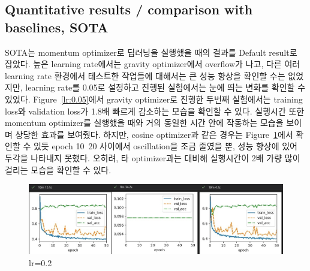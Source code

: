 \documentclass{article}
\begin{document}
\subsection{Quantitative results / comparison with baselines, SOTA}
SOTA는 momentum optimizer로 딥러닝을 실행했을 때의 결과를 Default result로 잡았다. 높은 learning rate에서는 gravity optimizer에서 overflow가 나고, 다른 여러 learning rate 환경에서 테스트한 작업들에 대해서는 큰 성능 향상을 확인할 수는 없었지만, learning rate를 0.05로 설정하고 진행된 실험에서는 눈에 띄는 변화를 확인할 수 있었다. Figure~\ref{lr:0.05}에서 gravity optimizer로 진행한 두번째 실험에서는 training loss와 validation loss가 1.8배 빠르게 감소하는 모습을 확인할 수 있다. 실행시간 또한 momentum optimizer를 실행했을 때와 거의 동일한 시간 안에 작동하는 모습을 보이며 상당한 효과를 보여줬다. 하지만, cosine optimizer과 같은 경우는 Figure~\ref{lr:0.2}에서 확인할 수 있듯 epoch 10~20 사이에서 oscillation을 조금 줄였을 뿐, 성능 향상에 있어 두각을 나타내지 못했다. 오히려, 타 optimizer과는 대비해 실행시간이 2배 가량 많이 걸리는 모습을 확인할 수 있다.

\begin{figure}[ht]
\begin{center}\centering
\includegraphics[width=\columnwidth]{img/lr0.2 m0.03.jpg}
\caption{lr=0.2}
\label{lr:0.2}
\end{center}
\end{figure}
\end{document}
